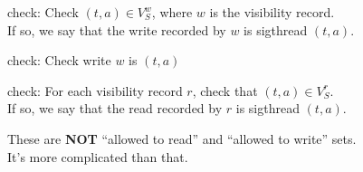 
 check: Check $(t,a) \in V_S^w$, where $w$ is the  visibility record.\\
If so, we say that the write recorded by $w$ is  sigthread $(t,a)$.


 check: Check write $w$ is  $(t,a)$

 check: For each  visibility record $r$, check that $(t,a) \in V_S^r$.\\
If so, we say that the read recorded by $r$ is  sigthread $(t,a)$.

 These are \textbf{NOT} ``allowed to read'' and ``allowed to write'' sets.\\
It's more complicated than that.

